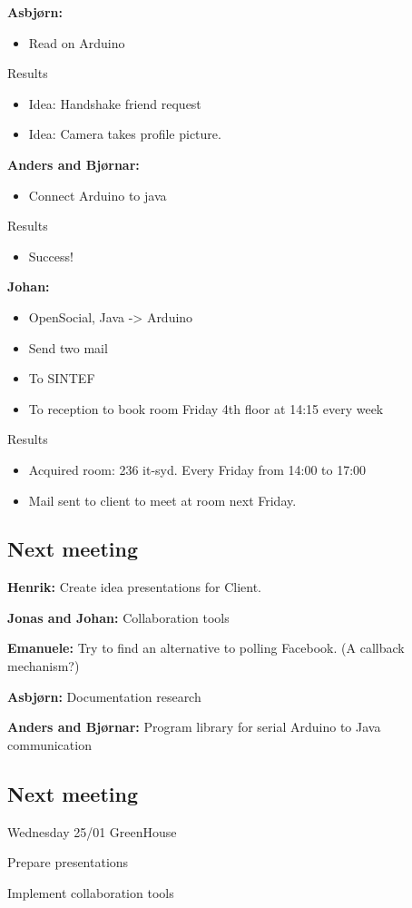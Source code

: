 {\bf Asbjørn: } \newline
\begin{itemize}
\item Read on Arduino
\end{itemize}

Results
\begin{itemize}
\item Idea: Handshake friend request
\item Idea: Camera takes profile picture.
\end{itemize}


{\bf Anders and Bjørnar: } \newline
\begin{itemize}
\item Connect Arduino to java
\end{itemize}

Results
\begin{itemize}
\item Success!
\end{itemize}

{\bf Johan: } \newline
\begin{itemize}
\item OpenSocial, Java -> Arduino
\item Send two mail
\item To SINTEF
\item To reception to book room Friday 4th floor at 14:15 every week
\end{itemize}

Results
\begin{itemize}
\item Acquired room: 236 it-syd. Every Friday from 14:00 to 17:00
\item Mail sent to client to meet at room next Friday.
\end{itemize}

\subsection{Next meeting}

{\bf Henrik: } \newline
Create idea presentations for Client.

{\bf Jonas and Johan: } \newline
Collaboration tools

{\bf Emanuele: } \newline
Try to find an alternative to polling Facebook. (A callback mechanism?)

{\bf Asbjørn: } \newline
Documentation research

{\bf Anders and Bjørnar: } \newline
Program library for serial Arduino to Java communication

\subsection{Next meeting}
Wednesday 25/01 GreenHouse

Prepare presentations

Implement collaboration tools
